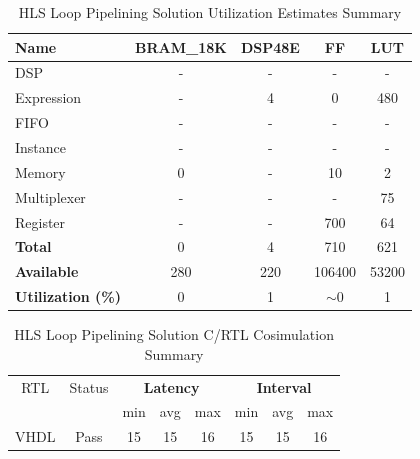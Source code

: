 \begin{table}[h]
    \centering
    \begin{tabular}{|l|c|c|c|c|}
        \hline
        \textbf{Name}    & \textbf{BRAM\_18K} & \textbf{DSP48E} & \textbf{FF} & \textbf{LUT} \\ \hline
        DSP              & -                   & -               & -           & -            \\ 
        Expression       & -                   & 4               & 0           & 480          \\ 
        FIFO             & -                   & -               & -           & -            \\ 
        Instance         & -                   & -               & -           & -            \\ 
        Memory           & 0                   & -               & 10          & 2            \\ 
        Multiplexer      & -                   & -               & -           & 75          \\ 
        Register         & -                   & -               & 700         & 64            \\ \hline
        \textbf{Total}   & 0                   & 4               & 710         & 621          \\ \hline
        \textbf{Available} & 280               & 220             & 106400      & 53200        \\ \hline
        \textbf{Utilization (\%)} & 0            & 1              & $\sim$0     & 1      \\ \hline
    \end{tabular}
    \caption{HLS Loop Pipelining Solution Utilization Estimates Summary}
    \label{tab:hls-loop-pipelining-solution-utilization-estimates-summary}
\end{table}

\begin{table}[H]
    \centering
    \begin{tabular}{|c|c|c|c|c|c|c|c|}
        \hline
        \multicolumn{1}{|c|}{RTL} & \multicolumn{1}{|c|}{Status} & \multicolumn{3}{c|}{\textbf{Latency}} & \multicolumn{3}{c|}{\textbf{Interval}} \\
        &  & min & avg & max & min & avg & max \\
        \hline
        VHDL & Pass & 15 & 15 & 16 & 15 & 15 & 16 \\
        \hline
    \end{tabular}
    \caption{HLS Loop Pipelining Solution C/RTL Cosimulation Summary }
    \label{tab:hls-loop-pipelining-solution-cosimulation-summary}
\end{table}

